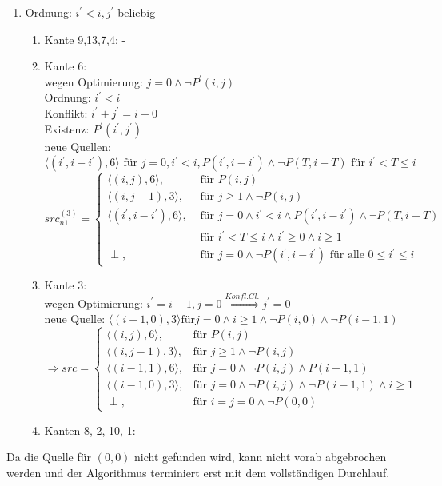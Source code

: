 \begin{enumerate}
      \item {Ordnung: \(i^\prime < i, j^\prime\) beliebig
          \begin{enumerate}
            \item Kante 9,13,7,4: -
            \item Kante 6: \\
              wegen Optimierung: \(j= 0 \land \neg P^\prime (i,j)\) \\
              Ordnung: \(i^\prime < i \) \\
              Konflikt: \( i^\prime + j^\prime = i + 0 \) \\
              Existenz: \( P^\prime(i^\prime, j^\prime) \) \\
              neue Quellen: \( \langle ( i^\prime, i-i^\prime ), 6 \rangle \text{ für } j=0, i^\prime < i , P(i^\prime, i - i ^\prime) \land \neg P(T, i-T) \text{ für } i^\prime < T \leq i \) \\

\( src^{(3)}_{n1} =
\begin{cases}
  \langle (i,j), 6 \rangle, & \mbox{ für } P(i,j) \\
  \langle (i,j-1), 3 \rangle, & \mbox{ für } j \geq 1 \land \neg P (i,j) \\
  \langle (i^\prime, i-i^\prime),6 \rangle, & \mbox{ für } j=0 \land i^\prime < i \land P(i^\prime, i - i^\prime) \land \neg P(T,i-T) \\ & \mbox{ für } i^\prime < T \leq i \land i^\prime \geq 0 \land i \geq 1 \\
  \perp, & \mbox{ für } j=0 \land \neg P(i^\prime, i - i^\prime) \text{ für alle } 0 \leq i^\prime \leq i
\end{cases} \)

\item Kante 3:\\
  wegen Optimierung: \( i^\prime = i - 1, j=0 \stackrel{Konfl. Gl.}{\Rightarrow} j^\prime = 0\) \\
  neue Quelle: \( \langle (i-1,0), 3 \rangle \text{für} j=0 \land i \geq 1 \land \neg P(i,0) \land \neg P(i-1,1) \) \\
\( \Rightarrow src =
\begin{cases}
  \langle (i, j), 6 \rangle, & \mbox{für } P(i,j) \\
  \langle (i, j-1), 3 \rangle, & \mbox{für } j \geq 1 \land \neg P(i,j) \\
  \langle (i-1, 1), 6 \rangle, & \mbox{für } j=0 \land \neg P(i,j) \land P(i-1,1) \\
  \langle (i-1, 0), 3 \rangle, & \mbox{für } j=0 \land \neg P(i,j) \land \neg P(i-1,1) \land i \geq 1 \\
  \perp, & \mbox{für } i=j=0 \land \neg P(0,0)
\end{cases}
\)
\item Kanten 8, 2, 10, 1: -
           \end{enumerate}
           }

\end{enumerate}
Da die Quelle für \( (0,0) \) nicht gefunden wird, kann nicht vorab abgebrochen werden und der Algorithmus terminiert erst mit dem vollständigen Durchlauf.
